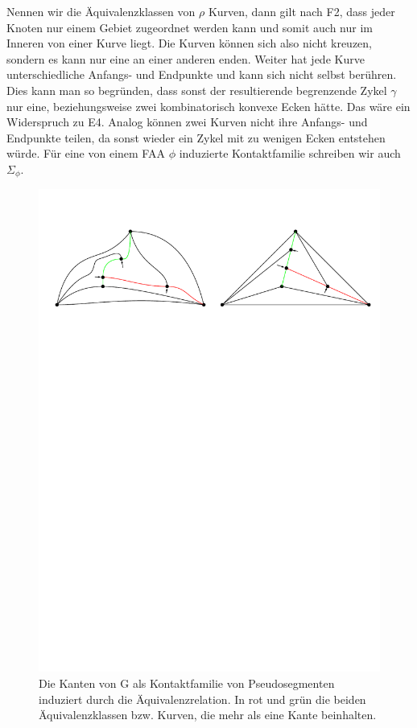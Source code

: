Nennen wir die Äquivalenzklassen von $\rho$ Kurven, dann gilt nach F2, dass jeder Knoten nur einem Gebiet zugeordnet werden kann und somit auch nur im Inneren von einer Kurve liegt. Die Kurven können sich also nicht kreuzen, sondern es kann nur eine an einer anderen enden. Weiter hat jede Kurve unterschiedliche Anfangs- und Endpunkte und kann sich nicht selbst berühren. Dies kann man so begründen, dass sonst der resultierende begrenzende Zykel $\gamma$ nur eine, beziehungsweise zwei kombinatorisch konvexe Ecken hätte. Das wäre ein Widerspruch zu E4. Analog können zwei Kurven nicht ihre Anfangs- und Endpunkte teilen, da sonst wieder ein Zykel mit zu wenigen Ecken entstehen würde. Für eine von einem FAA $\phi$ induzierte Kontaktfamilie schreiben wir auch $\Sigma_{\phi}$. 

\begin{figure}[h]
	\centering
  \includegraphics[width=1\textwidth]{pseudo_seg.pdf}
  \caption{Die Kanten von G als Kontaktfamilie von Pseudosegmenten induziert durch die Äquivalenzrelation. In rot und grün die beiden Äquivalenzklassen bzw. Kurven, die mehr als eine Kante beinhalten.}
\end{figure}

